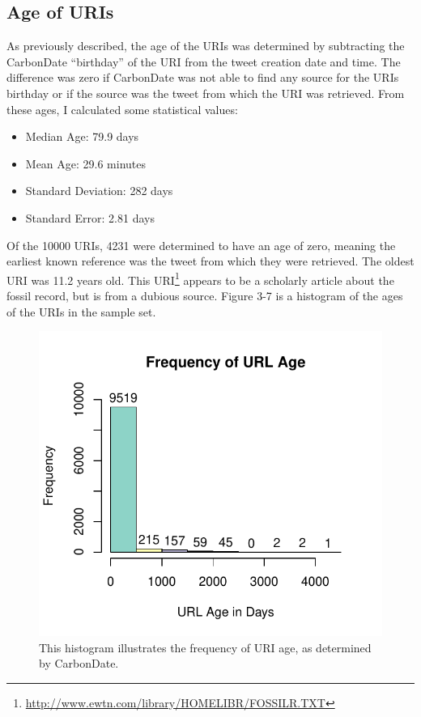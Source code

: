 \documentclass[a4paper,12pt]{article}
\begin{document}
\subsection{Age of URIs}
As previously described, the age of the URIs was determined by subtracting the CarbonDate
``birthday'' of the URI from the tweet creation date and time. The difference was zero if
CarbonDate was not able to find any source for the URIs birthday or if the source was the
tweet from which the URI was retrieved. From these ages, I calculated some statistical values:
\begin{itemize}
    \item Median Age: 79.9 days
    \item Mean Age: 29.6 minutes
    \item Standard Deviation: 282 days
    \item Standard Error: 2.81 days
\end{itemize}
Of the 10000 URIs, 4231 were determined to have an age of zero, meaning the earliest known
reference was the tweet from which they were retrieved. The oldest URI was 11.2 years old.
This URI\footnote{\url{http://www.ewtn.com/library/HOMELIBR/FOSSILR.TXT}} appears to be a
scholarly article about the fossil record, but is from a dubious source. Figure 3-7 is a
histogram of the ages of the URIs in the sample set.
\begin{figure}[H]
    \centering
    \includegraphics{stats/time_deltas.pdf}
    \caption{This histogram illustrates the frequency of URI age, as determined by CarbonDate.}
\end{figure}
\end{document}
